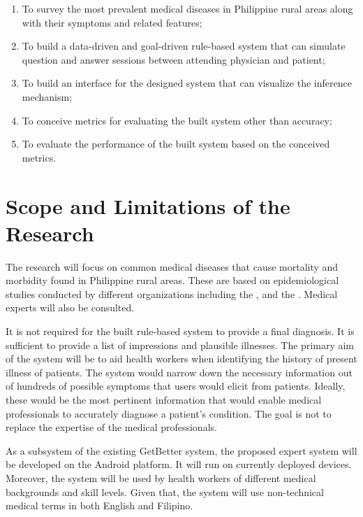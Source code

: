 \begin{enumerate}
    \item To survey the most prevalent medical diseases in Philippine rural areas along with their symptoms and related features;
    \item To build a data-driven and goal-driven rule-based system that can simulate question and answer sessions between attending physician and patient;
    \item To build an interface for the designed system that can visualize the inference mechanism; %
    \item To conceive metrics for evaluating the built system other than accuracy;
    \item To evaluate the performance of the built system based on the conceived metrics.
\end{enumerate}

\section{Scope and Limitations of the Research}
\label{sec:scopelimitations}

The research will focus on common medical diseases that cause mortality and morbidity found in Philippine rural areas.
These are based on epidemiological studies conducted by different organizations including the , and the .
Medical experts will also be consulted.

It is not required for the built rule-based system to provide a final diagnosis. It is sufficient to provide a list of impressions and plausible illnesses.
The primary aim of the system will be to aid health workers when identifying the history of present illness of patients.
The system would narrow down the necessary information out of hundreds of possible symptoms that users would elicit from patients.
Ideally, these would be the most pertinent information that would enable medical professionals to accurately diagnose a patient's condition.
The goal is not to replace the expertise of the medical professionals.

As a subsystem of the existing GetBetter system, the proposed expert system will be developed on the Android platform.
It will run on currently deployed devices.
Moreover, the system will be used by health workers of different medical backgrounds and skill levels.
Given that, the system will use non-technical medical terms in both English and Filipino.

